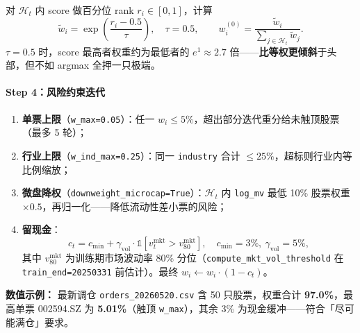 \documentclass[UTF8,a4paper,12pt]{ctexart}
\begin{document}
对 $\mathcal{H}_t$ 内 score 做百分位 rank $r_i\in[0,1]$，计算
\begin{equation}
  \tilde{w}_i = \exp\!\left(\frac{r_i - 0.5}{\tau}\right), \quad \tau=0.5,
  \qquad
  w_i^{(0)} = \frac{\tilde{w}_i}{\sum_{j\in\mathcal{H}_t}\tilde{w}_j}.
\end{equation}
$\tau=0.5$ 时，score 最高者权重约为最低者的 $e^{1}\approx 2.7$ 倍——\textbf{比等权更倾斜}于头部，但不如 argmax 全押一只极端。

\paragraph{Step 4：风险约束迭代}

\begin{enumerate}[leftmargin=2em]
  \item \textbf{单票上限}（\texttt{w\_max=0.05}）：任一 $w_i\le 5\%$，超出部分迭代重分给未触顶股票（最多 5 轮）；
  \item \textbf{行业上限}（\texttt{w\_ind\_max=0.25}）：同一 \texttt{industry} 合计 $\le 25\%$，超标则行业内等比例缩放；
  \item \textbf{微盘降权}（\texttt{downweight\_microcap=True}）：$\mathcal{H}_t$ 内 \texttt{log\_mv} 最低 10\% 股票权重 $\times 0.5$，再归一化——降低流动性差小票的风险；
  \item \textbf{留现金}：
  \begin{equation}
    c_t = c_{\min} + \gamma_{\mathrm{vol}}\cdot\mathbb{1}[v^{\mathrm{mkt}}_t > v^{\mathrm{mkt}}_{80}],
    \quad c_{\min}=3\%,\ \gamma_{\mathrm{vol}}=5\%,
  \end{equation}
  其中 $v^{\mathrm{mkt}}_{80}$ 为训练期市场波动率 80\% 分位（\texttt{compute\_mkt\_vol\_threshold} 在 \texttt{train\_end=20250331} 前估计）。最终 $w_i \leftarrow w_i\cdot(1-c_t)$。
\end{enumerate}

\textbf{数值示例：} 最新调仓 \texttt{orders\_20260520.csv} 含 50 只股票，权重合计 \textbf{97.0\%}，最高单票 002594.SZ 为 \textbf{5.01\%}（触顶 \texttt{w\_max}），其余 3\% 为现金缓冲——符合「尽可能满仓」要求。
\end{document}
